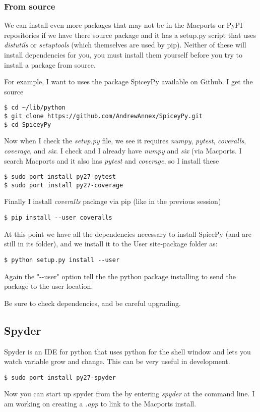 \documentclass[11pt, A4paper]{article}
\begin{document}
\subsubsection{From source}
We can install even more packages that may not be in the Macports or PyPI repositories if we have there source package and it has a setup.py script that uses {\it distutils} or {\it setuptools} (which themselves are used by pip). Neither of these will install dependencies for you, you must install them yourself before you try to install a package from source.

For example, I want to uses the package SpiceyPy available on Github. I get the source
\begin{lstlisting}[style=Bash]
$ cd ~/lib/python
$ git clone https://github.com/AndrewAnnex/SpiceyPy.git
$ cd SpiceyPy
\end{lstlisting}
Now when I check the {\it setup.py} file, we see it requires {\it numpy}, {\it pytest}, {\it coveralls}, {\it coverage}, and {\it six}. I check and I already have {\it numpy} and {\it six} (via Macports. I search Macports and it also has {\it pytest} and {\it coverage}, so I install these
\begin{lstlisting}[style=Bash]
$ sudo port install py27-pytest
$ sudo port install py27-coverage
\end{lstlisting}
Finally I install {\it coveralls} package via pip (like in the previous session)
\begin{lstlisting}[style=Bash]
$ pip install --user coveralls
\end{lstlisting}
At this point we have all the dependencies necessary to install SpicePy (and are still in its folder), and we install it to the User site-package folder as:
\begin{lstlisting}[style=Bash]
$ python setup.py install --user
\end{lstlisting}
Again the "-{}-user" option tell the the python package installing to send the package to the user location.

Be sure to check dependencies, and be careful upgrading.


\subsection{Spyder}
Spyder is an IDE for python that uses python for the shell window and lets you watch variable grow and change. This can be very useful in development.
\begin{lstlisting}[style=Bash]
$ sudo port install py27-spyder
\end{lstlisting}
Now you can start up spyder from the by entering {\it spyder} at the command line. I am working on creating a {\it .app} to link to the Macports install.
\end{document}
